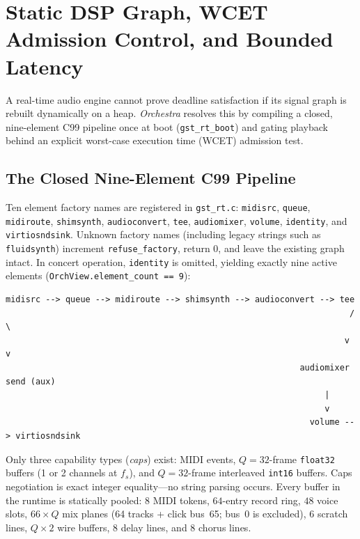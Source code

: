 \chapter{Static DSP Graph, WCET Admission Control, and Bounded Latency}
\label{ch:rtos-graph}

A real-time audio engine cannot prove deadline satisfaction if its signal graph is rebuilt dynamically on a heap. \emph{Orchestra} resolves this by compiling a closed, nine-element C99 pipeline once at boot (\texttt{gst\_rt\_boot}) and gating playback behind an explicit worst-case execution time (WCET) admission test.

\section{The Closed Nine-Element C99 Pipeline}

Ten element factory names are registered in \texttt{gst\_rt.c}: \texttt{midisrc}, \texttt{queue}, \texttt{midiroute}, \texttt{shimsynth}, \texttt{audioconvert}, \texttt{tee}, \texttt{audiomixer}, \texttt{volume}, \texttt{identity}, and \texttt{virtiosndsink}. Unknown factory names (including legacy strings such as \texttt{fluidsynth}) increment \texttt{refuse\_factory}, return $0$, and leave the existing graph intact. In concert operation, \texttt{identity} is omitted, yielding exactly nine active elements (\texttt{OrchView.element\_count == 9}):

\begin{lstlisting}[caption={Closed nine-element static signal graph in gst\_rt.c.}]
  midisrc --> queue --> midiroute --> shimsynth --> audioconvert --> tee
                                                                     / \
                                                                    v   v
                                                           audiomixer   send (aux)
                                                                |
                                                                v
                                                             volume --> virtiosndsink
\end{lstlisting}

Only three capability types (\emph{caps}) exist: MIDI events, $Q = 32$-frame \texttt{float32} buffers (1 or 2 channels at $f_s$), and $Q = 32$-frame interleaved \texttt{int16} buffers. Caps negotiation is exact integer equality—no string parsing occurs. Every buffer in the runtime is statically pooled: $8$ MIDI tokens, $64$-entry record ring, $48$ voice slots, $66\times Q$ mix planes (64 tracks + click bus~65; bus~0 is excluded), $6$ scratch lines, $Q\times 2$ wire buffers, $8$ delay lines, and $8$ chorus lines.

